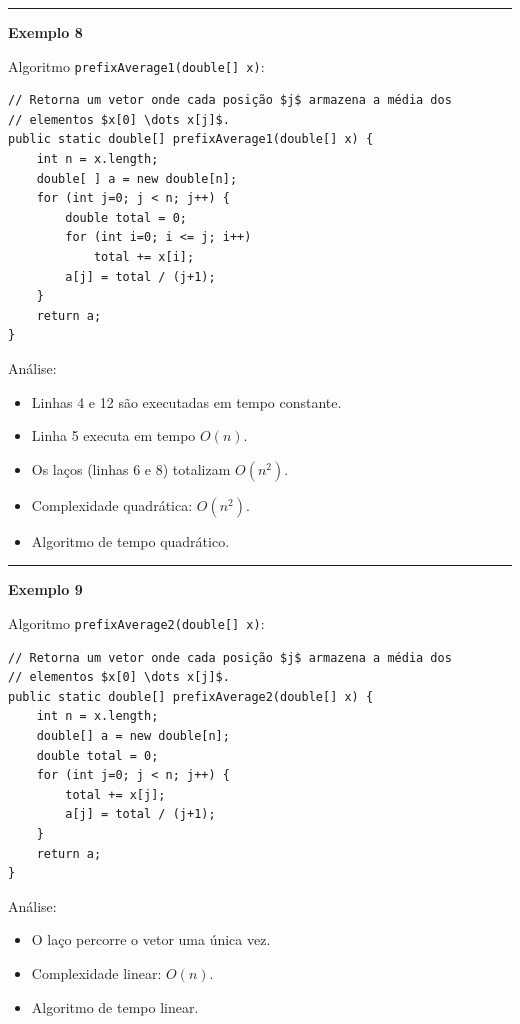 \rule{\textwidth}{1pt}

\textbf{Exemplo 8}

Algoritmo \texttt{prefixAverage1(double[] x)}:
\begin{verbatim}
// Retorna um vetor onde cada posição $j$ armazena a média dos
// elementos $x[0] \dots x[j]$.
public static double[] prefixAverage1(double[] x) {
	int n = x.length;
	double[ ] a = new double[n];
	for (int j=0; j < n; j++) {
		double total = 0;
		for (int i=0; i <= j; i++)
			total += x[i];
		a[j] = total / (j+1);
	}
	return a;
}
\end{verbatim}

Análise:
\begin{itemize}
	\item Linhas 4 e 12 são executadas em tempo constante.
	\item Linha 5 executa em tempo $O(n)$.
	\item Os laços (linhas 6 e 8) totalizam $O(n^2)$.
	\item Complexidade quadrática: $O(n^2)$.
	\item Algoritmo de tempo quadrático.
\end{itemize}

\rule{\textwidth}{1pt}

\textbf{Exemplo 9}

Algoritmo \texttt{prefixAverage2(double[] x)}:
\begin{verbatim}
// Retorna um vetor onde cada posição $j$ armazena a média dos
// elementos $x[0] \dots x[j]$.
public static double[] prefixAverage2(double[] x) {
	int n = x.length;
	double[] a = new double[n];
	double total = 0;
	for (int j=0; j < n; j++) {
		total += x[j];
		a[j] = total / (j+1);
	}
	return a;
}
\end{verbatim}

Análise:
\begin{itemize}
	\item O laço percorre o vetor uma única vez.
	\item Complexidade linear: $O(n)$.
	\item Algoritmo de tempo linear.
\end{itemize}

\clearpage


